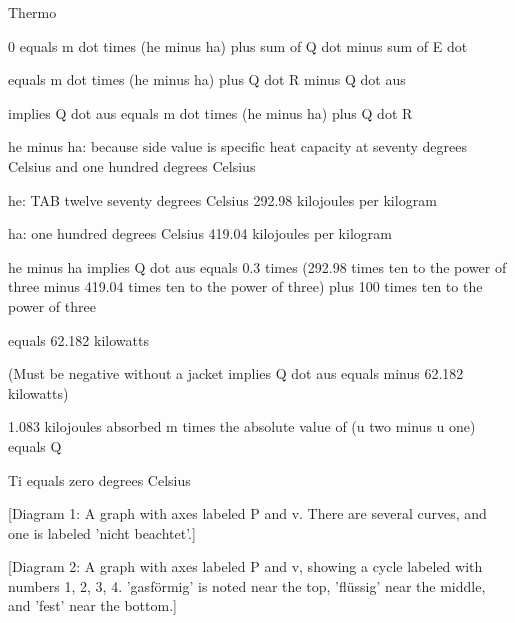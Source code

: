 Thermo

0 equals m dot times (he minus ha) plus sum of Q dot minus sum of E dot

equals m dot times (he minus ha) plus Q dot R minus Q dot aus

implies Q dot aus equals m dot times (he minus ha) plus Q dot R

he minus ha: because side value is specific heat capacity at seventy degrees Celsius and one hundred degrees Celsius

he: TAB twelve seventy degrees Celsius 292.98 kilojoules per kilogram

ha: one hundred degrees Celsius 419.04 kilojoules per kilogram

he minus ha implies Q dot aus equals 0.3 times (292.98 times ten to the power of three minus 419.04 times ten to the power of three) plus 100 times ten to the power of three

equals 62.182 kilowatts

(Must be negative without a jacket implies Q dot aus equals minus 62.182 kilowatts)

1.083 kilojoules absorbed  
m times the absolute value of (u two minus u one) equals Q

Ti equals zero degrees Celsius

[Diagram 1: A graph with axes labeled P and v. There are several curves, and one is labeled 'nicht beachtet'.]

[Diagram 2: A graph with axes labeled P and v, showing a cycle labeled with numbers 1, 2, 3, 4. 'gasförmig' is noted near the top, 'flüssig' near the middle, and 'fest' near the bottom.]